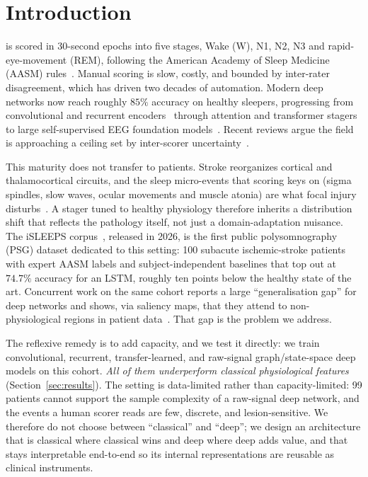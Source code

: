 \documentclass[journal]{IEEEtran}
\begin{document}
\section{Introduction}
 is scored in 30-second epochs into five stages, Wake (W),
N1, N2, N3 and rapid-eye-movement (REM), following the American Academy of Sleep
Medicine (AASM) rules~\cite{aasm2023manual}. Manual scoring is slow, costly, and
bounded by inter-rater disagreement, which has driven two decades of automation.
Modern deep networks now reach roughly $85\%$ accuracy on healthy sleepers,
progressing from convolutional and recurrent
encoders~\cite{supratak2017deepsleepnet,phan2019seqsleepnet} through attention and
transformer stagers~\cite{eldele2021attnsleep,phan2021xsleepnet,guo2024flexsleep}
to large self-supervised EEG foundation
models~\cite{labram2024,cbramod2025,eegpt2024}. Recent reviews argue the field is
approaching a ceiling set by inter-scorer uncertainty~\cite{yang2026review,
phan2022survey}.

This maturity does not transfer to patients. Stroke reorganizes cortical and
thalamocortical circuits, and the sleep micro-events that scoring keys on (sigma
spindles, slow waves, ocular movements and muscle atonia) are what
focal injury disturbs~\cite{gottselig2002stroke,fernandez2019spindles,
simpson2023laterality}. A stager tuned to healthy physiology therefore inherits a
distribution shift that reflects the pathology itself, not just a domain-adaptation
nuisance. The iSLEEPS corpus~\cite{maiti2026isleeps}, released in
2026, is the first public polysomnography (PSG) dataset dedicated to this setting:
100 subacute ischemic-stroke patients with expert AASM labels and
subject-independent baselines that top out at $74.7\%$ accuracy for an LSTM,
roughly ten points below the healthy state of the art. Concurrent work on the same
cohort reports a large ``generalisation gap'' for deep networks and shows, via
saliency maps, that they attend to non-physiological regions in patient
data~\cite{bose2026gap}. That gap is the problem we address.

The reflexive remedy is to add capacity, and we test it directly: we train
convolutional, recurrent, transfer-learned, and raw-signal graph/state-space deep
models on this cohort. \emph{All of them underperform classical physiological
features} (Section~\ref{sec:results}). The setting is data-limited rather than
capacity-limited: 99 patients cannot support the sample complexity of a
raw-signal deep network, and the events a human scorer reads are few,
discrete, and lesion-sensitive. We therefore do not choose between ``classical''
and ``deep''; we design an architecture that is classical where classical wins and
deep where deep adds value, and that stays interpretable end-to-end so its
internal representations are reusable as clinical instruments.
\end{document}
